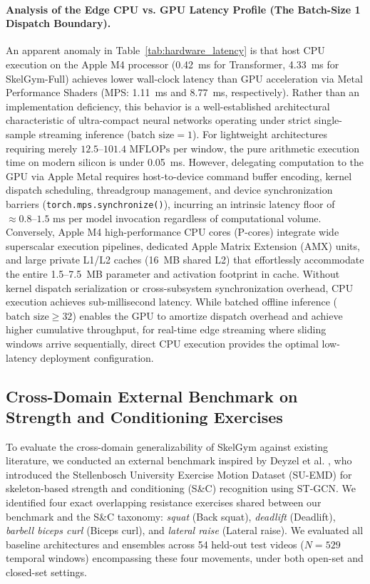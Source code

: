 \documentclass[preprint,12pt]{elsarticle}
\begin{document}
\paragraph{Analysis of the Edge CPU vs. GPU Latency Profile (The Batch-Size 1 Dispatch Boundary).}
An apparent anomaly in Table~\ref{tab:hardware_latency} is that host CPU execution on the Apple M4 processor (0.42~ms for Transformer, 4.33~ms for SkelGym-Full) achieves lower wall-clock latency than GPU acceleration via Metal Performance Shaders (MPS: 1.11~ms and 8.77~ms, respectively). Rather than an implementation deficiency, this behavior is a well-established architectural characteristic of ultra-compact neural networks operating under strict single-sample streaming inference ($\text{batch size} = 1$). For lightweight architectures requiring merely $12.5\text{--}101.4\text{ MFLOPs}$ per window, the pure arithmetic execution time on modern silicon is under 0.05~ms. However, delegating computation to the GPU via Apple Metal requires host-to-device command buffer encoding, kernel dispatch scheduling, threadgroup management, and device synchronization barriers (\texttt{torch.mps.synchronize()}), incurring an intrinsic latency floor of $\approx 0.8\text{--}1.5\text{ ms}$ per model invocation regardless of computational volume. Conversely, Apple M4 high-performance CPU cores (P-cores) integrate wide superscalar execution pipelines, dedicated Apple Matrix Extension (AMX) units, and large private L1/L2 caches (16~MB shared L2) that effortlessly accommodate the entire 1.5--7.5~MB parameter and activation footprint in cache. Without kernel dispatch serialization or cross-subsystem synchronization overhead, CPU execution achieves sub-millisecond latency. While batched offline inference ($\text{batch size} \ge 32$) enables the GPU to amortize dispatch overhead and achieve higher cumulative throughput, for real-time edge streaming where sliding windows arrive sequentially, direct CPU execution provides the optimal low-latency deployment configuration.

\subsection{Cross-Domain External Benchmark on Strength and Conditioning Exercises}
\label{sec:external_benchmark}
To evaluate the cross-domain generalizability of SkelGym against existing literature, we conducted an external benchmark inspired by Deyzel et al. \cite{deyzel2023}, who introduced the Stellenbosch University Exercise Motion Dataset (SU-EMD) for skeleton-based strength and conditioning (S\&C) recognition using ST-GCN. We identified four exact overlapping resistance exercises shared between our benchmark and the S\&C taxonomy: \textit{squat} (Back squat), \textit{deadlift} (Deadlift), \textit{barbell biceps curl} (Biceps curl), and \textit{lateral raise} (Lateral raise). We evaluated all baseline architectures and ensembles across 54 held-out test videos ($N=529$ temporal windows) encompassing these four movements, under both open-set and closed-set settings.
\end{document}
